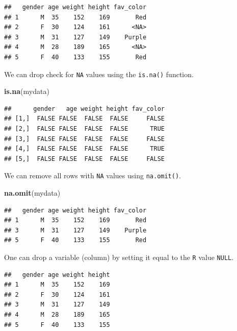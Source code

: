 \documentclass[
]{book}
\newenvironment{Shaded}{\begin{snugshade}}{\end{snugshade}}
\newcommand{\KeywordTok}[1]{\textcolor[rgb]{0.13,0.29,0.53}{\textbf{#1}}}
\newcommand{\NormalTok}[1]{#1}
\newcommand{\OperatorTok}[1]{\textcolor[rgb]{0.81,0.36,0.00}{\textbf{#1}}}
\newcommand{\OtherTok}[1]{\textcolor[rgb]{0.56,0.35,0.01}{#1}}
\newcommand{\StringTok}[1]{\textcolor[rgb]{0.31,0.60,0.02}{#1}}
\begin{document}
\begin{verbatim}
##   gender age weight height fav_color
## 1      M  35    152    169       Red
## 2      F  30    124    161      <NA>
## 3      M  31    127    149    Purple
## 4      M  28    189    165      <NA>
## 5      F  40    133    155       Red
\end{verbatim}

We can drop check for \texttt{NA} values using the \texttt{is.na()} function.

\begin{Shaded}
\begin{Highlighting}[]
\KeywordTok{is.na}\NormalTok{(mydata)}
\end{Highlighting}
\end{Shaded}

\begin{verbatim}
##      gender   age weight height fav_color
## [1,]  FALSE FALSE  FALSE  FALSE     FALSE
## [2,]  FALSE FALSE  FALSE  FALSE      TRUE
## [3,]  FALSE FALSE  FALSE  FALSE     FALSE
## [4,]  FALSE FALSE  FALSE  FALSE      TRUE
## [5,]  FALSE FALSE  FALSE  FALSE     FALSE
\end{verbatim}

We can remove all rows with \texttt{NA} values using \texttt{na.omit()}.

\begin{Shaded}
\begin{Highlighting}[]
\KeywordTok{na.omit}\NormalTok{(mydata)}
\end{Highlighting}
\end{Shaded}

\begin{verbatim}
##   gender age weight height fav_color
## 1      M  35    152    169       Red
## 3      M  31    127    149    Purple
## 5      F  40    133    155       Red
\end{verbatim}

One can drop a variable (column) by setting it equal to the \texttt{R} value \texttt{NULL}.

\begin{Shaded}
\end{Shaded}

\begin{verbatim}
##   gender age weight height
## 1      M  35    152    169
## 2      F  30    124    161
## 3      M  31    127    149
## 4      M  28    189    165
## 5      F  40    133    155
\end{verbatim}
\end{document}
